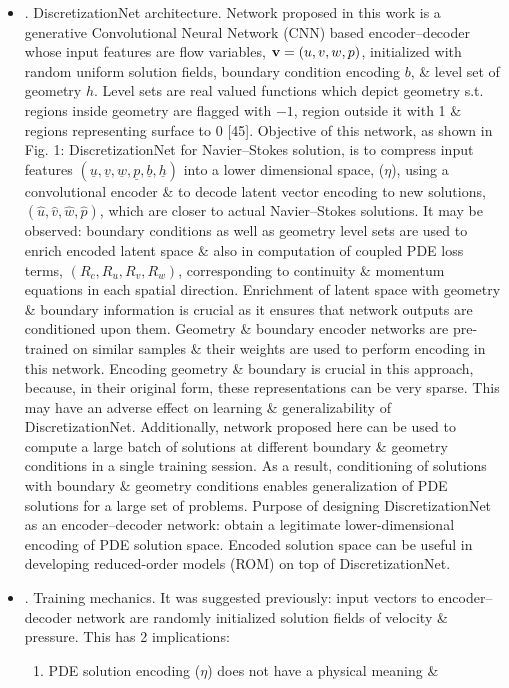 \documentclass{article}
\begin{document}
\begin{itemize}
\begin{itemize}
		\item {. DiscretizationNet architecture.} Network proposed in this work is a generative Convolutional Neural Network (CNN) based encoder--decoder whose input features are flow variables, ${\bf v} = (u,v,w,p)$, initialized with random uniform solution fields, boundary condition encoding $b$, \& level set of geometry $h$. Level sets are real valued functions which depict geometry s.t. regions inside geometry are flagged with $-1$, region outside it with 1 \& regions representing surface to 0 [45]. Objective of this network, as shown in {\sf Fig. 1: DiscretizationNet for Navier--Stokes solution}, is to compress input features $(\underline{u},\underline{v},\underline{w},\underline{p},\underline{b},\underline{h})$ into a lower dimensional space, ($\eta$), using a convolutional encoder \& to decode latent vector encoding to new solutions, $(\hat{u},\hat{v},\hat{w},\hat{p})$, which are closer to actual Navier--Stokes solutions. It may be observed: boundary conditions as well as geometry level sets are used to enrich encoded latent space \& also in computation of coupled PDE loss terms, $(R_c,R_u,R_v,R_w)$, corresponding to continuity \& momentum equations in each spatial direction. Enrichment of latent space with geometry \& boundary information is crucial as it ensures that network outputs are conditioned upon them. Geometry \& boundary encoder networks are pre-trained on similar samples \& their weights are used to perform encoding in this network. Encoding geometry \& boundary is crucial in this approach, because, in their original form, these representations can be very sparse. This may have an adverse effect on learning \& generalizability of DiscretizationNet. Additionally, network proposed here can be used to compute a large batch of solutions at different boundary \& geometry conditions in a single training session. As a result, conditioning of solutions with boundary \& geometry conditions enables generalization of PDE solutions for a large set of problems. Purpose of designing DiscretizationNet as an encoder--decoder network: obtain a legitimate lower-dimensional encoding of PDE solution space. Encoded solution space can be useful in developing reduced-order models (ROM) on top of DiscretizationNet.
		\item {. Training mechanics.} It was suggested previously: input vectors to encoder--decoder network are randomly initialized solution fields of velocity \& pressure. This has 2 implications:
		\begin{enumerate}
			\item PDE solution encoding ($\eta$) does not have a physical meaning \&

\end{enumerate}
\end{itemize}
\end{itemize}
\end{document}
